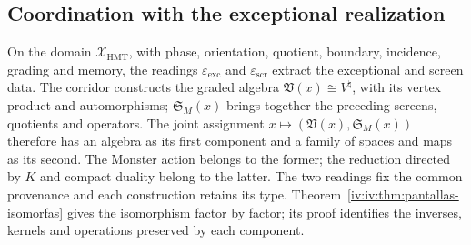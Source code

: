 \subsection{Coordination with the exceptional realization}

On the domain \(\mathcal X_{\mathrm{HMT}}\), with phase, orientation,
quotient, boundary, incidence, grading and memory, the readings
\(\varepsilon_{\mathrm{exc}}\) and \(\varepsilon_{\mathrm{scr}}\) extract
the exceptional and screen data. The corridor constructs the graded
algebra \(\mathfrak V(x)\cong V^\natural\), with its vertex product
and automorphisms; \(\mathfrak S_M(x)\) brings together the preceding screens, quotients
and operators. The joint assignment
\(x\mapsto(\mathfrak V(x),\mathfrak S_M(x))\) therefore has an
algebra as its first component and a family of spaces and maps as its second.
The Monster action belongs to the former; the reduction directed by \(K\)
and compact duality belong to the latter. The two readings fix the common
provenance and each construction retains its type.
Theorem~\ref{iv:iv:thm:pantallas-isomorfas} gives the isomorphism
factor by factor; its proof identifies the inverses, kernels
and operations preserved by each component.

